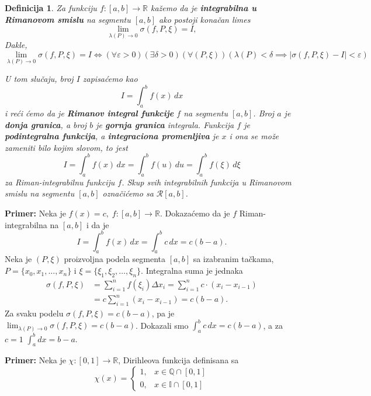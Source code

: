 \documentclass[a4paper,12pt,twoside]{report}
\newtheorem{definition}{Definicija}[section]
\numberwithin{algorithm}{section}
\begin{document}
\vspace{0.5cm}
\begin{definition}
    Za funkciju $f: [a, b] \to \mathbb{R}$ kažemo da je \textbf{integrabilna u Rimanovom smislu} na segmentu $[a, b]$ ako postoji konačan limes 
    \[
        \lim_{\lambda(P) \to 0} \sigma(f, P, \xi) = I,
    \]
    Dakle,
\[
    \lim_{\lambda(P) \to 0} \sigma(f, P, \xi) = I \iff (\forall \varepsilon > 0) (\exists \delta > 0) (\forall (P, \xi)) (\lambda(P) < \delta \implies |\sigma(f, P, \xi) - I| < \varepsilon)
\]

U tom slučaju, broj $I$ zapisaćemo kao 
\[
    I = \int_a^b f(x) \, dx
\]
i reći ćemo da je \textbf{Rimanov integral funkcije} $f$ na segmentu $[a, b]$.
Broj $a$ je \textbf{donja granica}, a broj $b$ je \textbf{gornja granica} integrala. Funkcija $f$ je \textbf{podintegralna funkcija}, a \textbf{integraciona promenljiva} je $x$ i ona se može zameniti bilo kojim slovom, to jest
\[
    I = \int_a^b f(x) \, dx = \int_a^b f(u) \, du = \int_a^b f(\xi) \, d\xi
\]
za Riman-integrabilnu funkciju $f$.
Skup svih integrabilnih funkcija u Rimanovom smislu na segmentu $[a, b]$ označićemo sa $\mathcal{R}[a, b]$.

\end{definition}

\vspace{0.5cm}
\noindent \textbf{Primer:} Neka je $f(x) = c, \; f: [a, b] \to \mathbb{R}$.
Dokazaćemo da je $f$ Riman-integrabilna na $[a, b]$ i da je 
\[
    I = \int_a^b f(x) \, dx = \int_a^b c \, dx = c(b-a).
\]
Neka je $(P, \xi)$ proizvoljna podela segmenta $[a, b]$ sa izabranim tačkama, $P = \{x_0, x_1, \dots, x_n\}$ i 
$\xi = \{\xi_1, \xi_2, \dots, \xi_n\}$. Integralna suma je jednaka
\begin{align*}
    \sigma(f, P, \xi) &= \sum_{i=1}^n f(\xi_i) \Delta x_i = \sum_{i=1}^n c \cdot (x_i - x_{i-1}) \\
    &= c \sum_{i=1}^n (x_i - x_{i-1}) = c(b-a).
\end{align*}
Za svaku podelu $\sigma(f, P, \xi) = c(b-a)$, pa je $\lim_{\lambda(P) \to 0} \sigma(f, P, \xi) = c(b-a)$.
Dokazali smo $\int_a^b c \, dx = c(b-a)$, a za $c=1$ $\int_a^b dx = b-a$.

\vspace{0.5cm}
\noindent \textbf{Primer:} Neka je $\chi: [0, 1] \to \mathbb{R}$, Dirihleova funkcija definisana sa
\[
    \chi(x) = 
    \begin{cases} 
        1, & x \in \mathbb{Q} \cap [0, 1] \\
        0, & x \in \mathbb{I} \cap [0, 1]
    \end{cases}
\]
\end{document}
